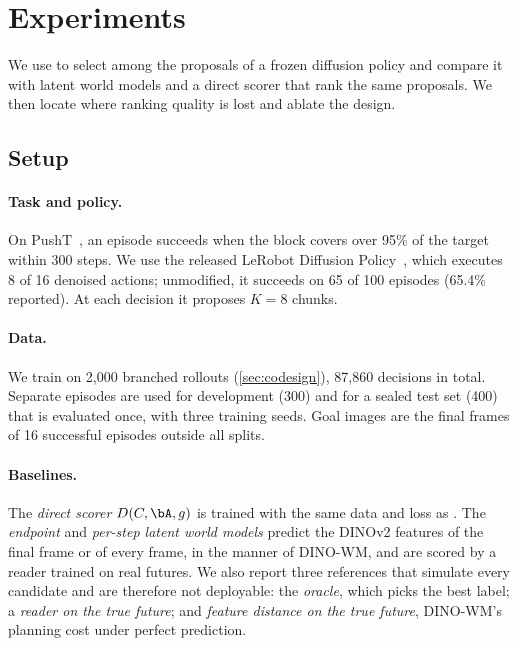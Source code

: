 \section{Experiments}
\label{sec:experiments}

We use \method to select among the proposals of a frozen diffusion policy and compare it with latent world models and a direct scorer that rank the same proposals.
We then locate where ranking quality is lost and ablate the design.

\subsection{Setup}
\label{sec:setup}

\paragraph{Task and policy.}
On PushT~\cite{florence2021ibc}, an episode succeeds when the block covers over 95\% of the target within 300 steps.
We use the released LeRobot Diffusion Policy~\cite{chi2023diffusion}, which executes 8 of 16 denoised actions; unmodified, it succeeds on 65 of 100 episodes (65.4\% reported).
At each decision it proposes $K{=}8$ chunks. 

\paragraph{Data.}
We train on 2{,}000 branched rollouts (\cref{sec:codesign}), 87{,}860 decisions in total.
Separate episodes are used for development (300) and for a sealed test set (400) that is evaluated once, with three training seeds.
Goal images are the final frames of 16 successful episodes outside all splits.

\paragraph{Baselines.}
The \emph{direct scorer} $D(C,\bA,g)$ is trained with the same data and loss as \method.
The \emph{endpoint} and \emph{per-step latent world models} predict the DINOv2 features of the final frame or of every frame, in the manner of DINO-WM, and are scored by a reader trained on real futures.
We also report three references that simulate every candidate and are therefore not deployable: the \emph{oracle}, which picks the best label; a \emph{reader on the true future}; and \emph{feature distance on the true future}, DINO-WM's planning cost under perfect prediction.

